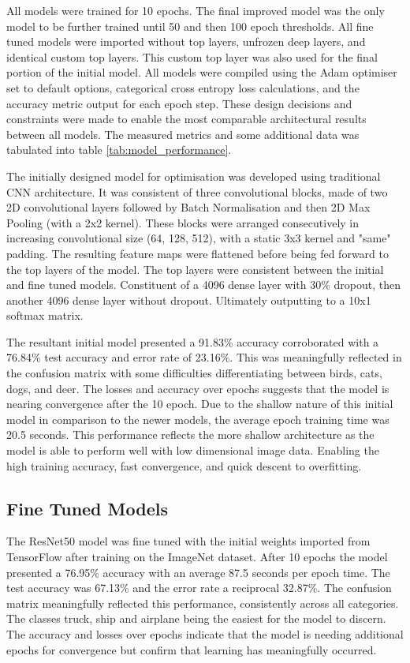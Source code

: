 \documentclass[10pt,twocolumn,letterpaper]{article}
\begin{document}
All models were trained for 10 epochs. The final improved model was the only model to be further trained until 50 and then 100 epoch thresholds. All fine tuned models were imported without top layers, unfrozen deep layers, and identical custom top layers. This custom top layer was also used for the final portion of the initial model. All models were compiled using the Adam optimiser set to default options, categorical cross entropy loss calculations, and the accuracy metric output for each epoch step. These design decisions and constraints were made to enable the most comparable architectural results between all models. The measured metrics and some additional data was tabulated into table \ref{tab:model_performance}. 



The initially designed model for optimisation was developed using traditional CNN architecture. It was consistent of three convolutional blocks, made of two 2D convolutional layers followed by Batch Normalisation and then 2D Max Pooling (with a 2x2 kernel). These blocks were arranged consecutively in increasing convolutional size (64, 128, 512), with a static 3x3 kernel and "same" padding. The resulting feature maps were flattened before being fed forward to the top layers of the model. The top layers were consistent between the initial and fine tuned models. Constituent of a 4096 dense layer with 30\% dropout, then another 4096 dense layer without dropout. Ultimately outputting to a 10x1 softmax matrix. 

The resultant initial model presented a 91.83\% accuracy corroborated with a 76.84\% test accuracy and error rate of 23.16\%. This was meaningfully reflected in the confusion matrix with some difficulties differentiating between birds, cats, dogs, and deer. The losses and accuracy over epochs suggests that the model is nearing convergence after the 10 epoch. Due to the shallow nature of this initial model in comparison to the newer models, the average epoch training time was 20.5 seconds. This performance reflects the more shallow architecture as the model is able to perform well with low dimensional image data. Enabling the high training accuracy, fast convergence, and quick descent to overfitting. 

\subsection{Fine Tuned Models}
The ResNet50 model was fine tuned with the initial weights imported from TensorFlow after training on the ImageNet dataset. After 10 epochs the model presented a 76.95\% accuracy with an average 87.5 seconds per epoch time. The test accuracy was 67.13\% and the error rate a reciprocal 32.87\%. The confusion matrix meaningfully reflected this performance, consistently across all categories. The classes truck, ship and airplane being the easiest for the model to discern. The accuracy and losses over epochs indicate that the model is needing additional epochs for convergence but confirm that learning has meaningfully occurred.
\end{document}
